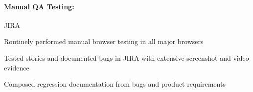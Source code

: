 \begin{position}
  \paragraph{Manual QA Testing:} JIRA
  \begin{myitem}
  \item Routinely performed manual browser testing in all major browsers
  \item Tested stories and documented bugs in JIRA with extensive screenshot and video evidence
  \item Composed regression documentation from bugs and product requirements
  \end{myitem}
\end{position}
